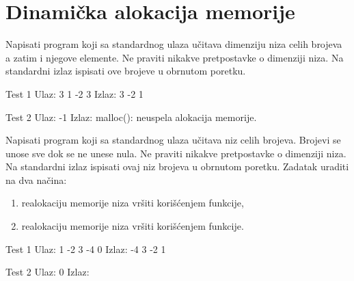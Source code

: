 \section{Dinamička alokacija memorije}

\begin{Exercise}[label=328]
Napisati program koji sa standardnog ulaza učitava dimenziju  
niza celih brojeva a zatim i njegove elemente. Ne praviti
nikakve pretpostavke o dimenziji niza. Na standardni izlaz 
ispisati ove brojeve u obrnutom poretku. 

\begin{minitest}
\begin{test}{Test 1}
Ulaz:  3
       1 -2 3
Izlaz: 3 -2 1
\end{test}
\end{minitest}
\begin{maxitest}
\begin{test}{Test 2}
Ulaz:  -1       
Izlaz: malloc(): neuspela alokacija memorije.
\end{test}
\end{maxitest}

\end{Exercise}
\begin{Answer}[ref=328]
\end{Answer}

\begin{Exercise}[label=330]
Napisati program koji sa standardnog ulaza učitava niz celih
brojeva. Brojevi se unose sve dok se ne unese nula. Ne praviti
nikakve pretpostavke o dimenziji niza. Na standardni izlaz
ispisati ovaj niz brojeva u obrnutom poretku. Zadatak uraditi na dva načina:
\begin{enumerate}
\item realokaciju memorije niza vršiti korišćenjem  funkcije,
\item realokaciju memorije niza vršiti korišćenjem  funkcije.
\end{enumerate}

\begin{minitest}
\begin{test}{Test 1}
Ulaz:  1 -2 3 -4 0
Izlaz: -4 3 -2 1
\end{test}
\end{minitest}
\begin{minitest}
\begin{test}{Test 2}
Ulaz:  0
Izlaz:
\end{test}
\end{minitest}
\end{Exercise}
\begin{Answer}[ref=330]
\end{Answer}

